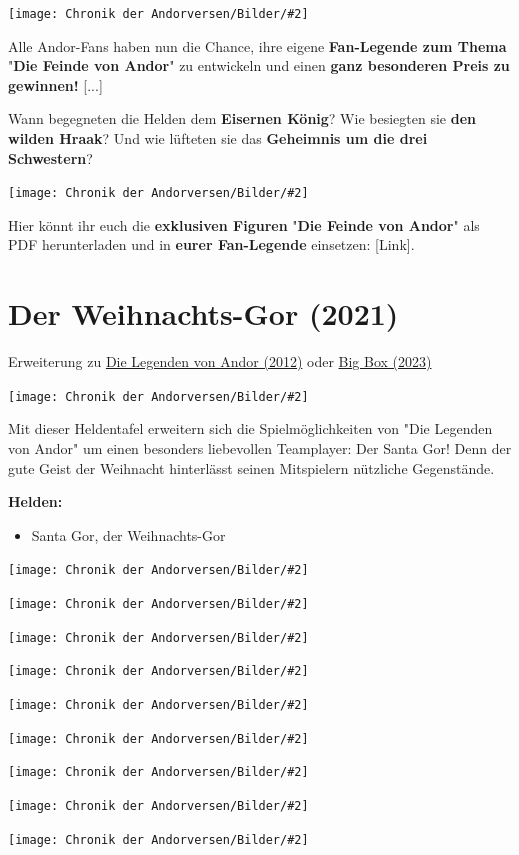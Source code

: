 \documentclass[10pt, a4paper, oneside]{book}
\newcommand{\fillbreak}{\vspace*{\fill}\columnbreak}
\newcommand{\produkt}[1]{%
    \section{#1}%
    \label{Produkt: #1}%
}
\newcommand{\refprodukt}[1]{\hyperref[Produkt: #1]{#1}}
\newcommand{\bildmitts}[2][height=0.32\textwidth,width=0.48\textwidth,keepaspectratio]{%
    \begin{center}
        \texttt{[image: Chronik der Andorversen/Bilder/\#2]}
    \end{center}
}
\begin{document}
\begin{multicols}{2}
\bildmitts{Die Feinde 1.jpeg}

Alle Andor-Fans haben nun die Chance, ihre eigene \textbf{Fan-Legende zum Thema} "\textbf{Die Feinde von Andor}" zu entwickeln und einen \textbf{ganz besonderen Preis zu gewinnen!} [...]

Wann begegneten die Helden dem \textbf{Eisernen König}? Wie besiegten sie \textbf{den wilden Hraak}? Und wie lüfteten sie das \textbf{Geheimnis um die drei Schwestern}?


\bildmitts{Die Feinde 2.jpeg}

Hier könnt ihr euch die \textbf{exklusiven Figuren} "\textbf{Die Feinde von Andor}" als PDF herunterladen und in \textbf{eurer Fan-Legende} einsetzen:
[Link].


\fillbreak

\produkt{Der Weihnachts-Gor (2021)}

\begin{center}
    Erweiterung zu \refprodukt{Die Legenden von Andor (2012)} oder \refprodukt{Big Box (2023)}
\end{center}

\bildmitts{Der Santa Gor.jpeg}

Mit dieser Heldentafel erweitern sich die Spielmöglichkeiten von "Die Legenden von Andor" um einen besonders liebevollen Teamplayer: Der Santa Gor! Denn der gute Geist der Weihnacht hinterlässt seinen Mitspielern nützliche Gegenstände.\bigskip 


\textbf{Helden:} 

\begin{itemize}[topsep=0pt,itemsep=-1ex,partopsep=1ex,parsep=1ex]
    \item Santa Gor, der Weihnachts-Gor
\end{itemize}


\bildmitts{Weihnachten 1.jpeg}

\bildmitts{Weihnachten 2.jpeg}

\bildmitts{Weihnachten 3.jpeg}

\bildmitts{Weihnachten 4.jpeg}


\bildmitts{Weihnachten 6.jpeg}

\bildmitts{Weihnachten 7.jpeg}

\bildmitts{Weihnachten 8.jpeg}

\bildmitts{Weihnachten 9.jpeg}

\bildmitts{Weihnachten 10.jpeg}






\end{multicols}
\end{document}
